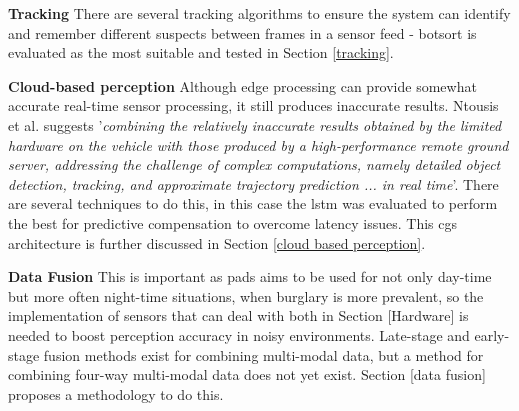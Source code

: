 \documentclass{report_template_oxford}
\begin{document}
\textbf{Tracking} \quad There are several tracking algorithms to ensure the system can identify and remember different suspects between frames in a sensor feed - \gls{botsort} is evaluated as the most suitable and tested in Section \ref{tracking}. 

\textbf{Cloud-based perception} \quad Although edge processing can provide somewhat accurate real-time sensor processing, it still produces inaccurate results. Ntousis et al. suggests '\textit{combining the relatively inaccurate results obtained by the limited hardware on the vehicle with those produced by a high-performance remote ground server, addressing the challenge of complex computations, namely detailed object detection, tracking, and approximate trajectory prediction ... in real time}'. There are several techniques to do this, in this case the \gls{lstm} was evaluated to perform the best for predictive compensation to overcome latency issues. This  \gls{cgs} architecture is further discussed in Section \ref{cloud based perception}. 

\textbf{Data Fusion} \quad This is important as \gls{pads} aims to be used for not only day-time but more often night-time situations, when burglary is more prevalent, so the implementation of sensors that can deal with both in Section [Hardware] is needed to boost perception accuracy in noisy environments. Late-stage and early-stage fusion methods exist for combining multi-modal data, but a method for combining four-way multi-modal data  does not yet exist. Section [data fusion] proposes a methodology to do this. 
\end{document}
